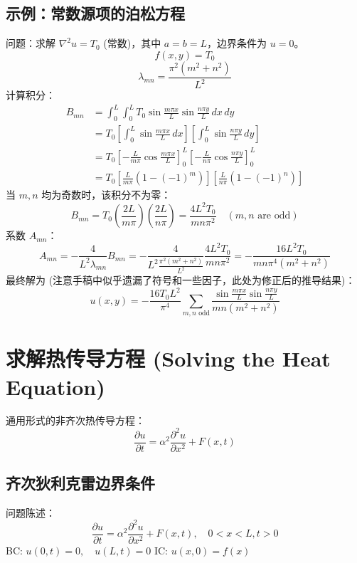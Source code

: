\documentclass{article}
\begin{document}
	\subsection{示例：常数源项的泊松方程}
	问题：求解 $\nabla^2 u = T_0$ (常数)，其中 $a=b=L$，边界条件为 $u=0$。
	$$ f(x,y) = T_0 $$
	$$ \lambda_{mn} = \frac{\pi^2(m^2+n^2)}{L^2} $$
	计算积分：
	\begin{align*}
		B_{mn} &= \int_0^L \int_0^L T_0 \sin\frac{m\pi x}{L} \sin\frac{n\pi y}{L} \,dx\,dy \\
		&= T_0 \left[ \int_0^L \sin\frac{m\pi x}{L} \,dx \right] \left[ \int_0^L \sin\frac{n\pi y}{L} \,dy \right] \\
		&= T_0 \left[ -\frac{L}{m\pi}\cos\frac{m\pi x}{L} \right]_0^L \left[ -\frac{L}{n\pi}\cos\frac{n\pi y}{L} \right]_0^L \\
		&= T_0 \left[ \frac{L}{m\pi}(1-(-1)^m) \right] \left[ \frac{L}{n\pi}(1-(-1)^n) \right]
	\end{align*}
	当 $m, n$ 均为奇数时，该积分不为零：
	$$ B_{mn} = T_0 \left( \frac{2L}{m\pi} \right) \left( \frac{2L}{n\pi} \right) = \frac{4L^2 T_0}{mn\pi^2} \quad (m, n \text{ are odd}) $$
	系数 $A_{mn}$：
	$$ A_{mn} = -\frac{4}{L^2 \lambda_{mn}} B_{mn} = -\frac{4}{L^2 \frac{\pi^2(m^2+n^2)}{L^2}} \frac{4L^2 T_0}{mn\pi^2} = -\frac{16L^2 T_0}{mn\pi^4 (m^2+n^2)} $$
	最终解为 (注意手稿中似乎遗漏了符号和一些因子，此处为修正后的推导结果)：
	$$ u(x,y) = -\frac{16 T_0 L^2}{\pi^4} \sum_{m,n \text{ odd}} \frac{\sin\frac{m\pi x}{L} \sin\frac{n\pi y}{L}}{mn(m^2+n^2)} $$
	
	\newpage
	\section{求解热传导方程 (Solving the Heat Equation)}
	通用形式的非齐次热传导方程：
	$$ \frac{\partial u}{\partial t} = \alpha^2 \frac{\partial^2 u}{\partial x^2} + F(x,t) $$
	
	\subsection{齐次狄利克雷边界条件}
	问题陈述：
	$$ \frac{\partial u}{\partial t} = \alpha^2 \frac{\partial^2 u}{\partial x^2} + F(x,t), \quad 0 < x < L, t > 0 $$
	BC: $u(0,t) = 0, \quad u(L,t) = 0$
	IC: $u(x,0) = f(x)$
	
\end{document}
